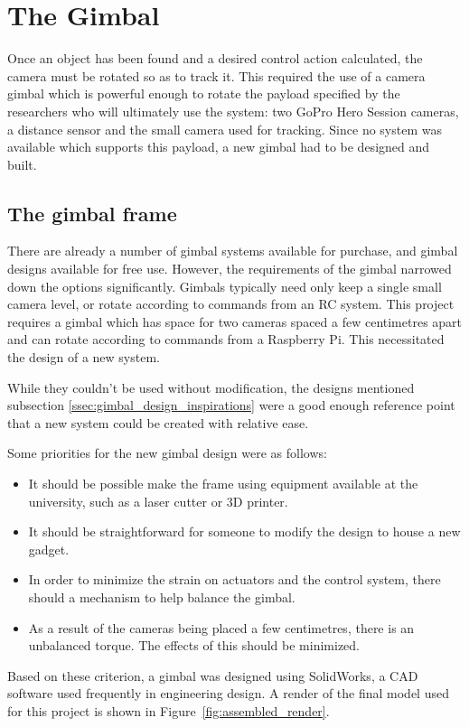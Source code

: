 \chapter{The Gimbal}
Once an object has been found and a desired control action calculated, the camera must be rotated so as to track it. This required the use of a camera gimbal which is powerful enough to rotate the payload specified by the researchers who will ultimately use the system: two GoPro Hero Session cameras, a distance sensor and the small camera used for tracking. Since no system was available which supports this payload, a new gimbal had to be designed and built.

\section{The gimbal frame}
There are already a number of gimbal systems available for purchase, and gimbal designs available for free use. However, the requirements of the gimbal narrowed down the options significantly. Gimbals typically need only keep a single small camera level, or rotate according to commands from an RC system. This project requires a gimbal which has space for two cameras spaced a few centimetres apart and can rotate according to commands from a Raspberry Pi. This necessitated the design of a new system.

While they couldn't be used without modification, the designs mentioned subsection \ref{ssec:gimbal_design_inspirations} were a good enough reference point that a new system could be created with relative ease.

Some priorities for the new gimbal design were as follows:

\begin{itemize}
\item It should be possible make the frame using equipment available at the university, such as a laser cutter or 3D printer.
\item It should be straightforward for someone to modify the design to house a new gadget.
\item In order to minimize the strain on actuators and the control system, there should a mechanism to help balance the gimbal.
\item As a result of the cameras being placed a few centimetres, there is an unbalanced torque. The effects of this should be minimized.
\end{itemize}
%
Based on these criterion, a gimbal was designed using SolidWorks, a CAD software used frequently in engineering design. A render of the final model used for this project is shown in Figure~\ref{fig:assembled_render}.


